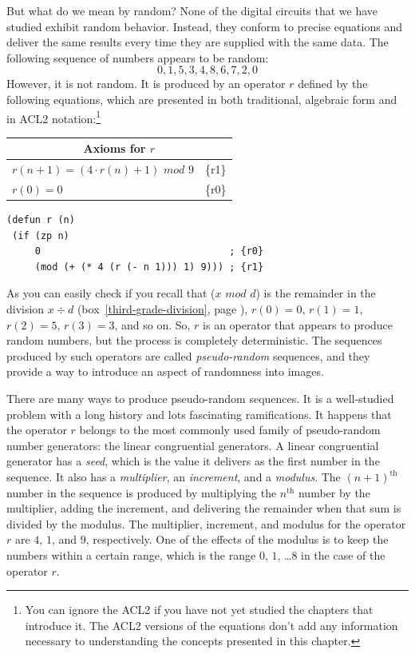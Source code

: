 But what do we mean by random?
None of the digital circuits
that we have studied exhibit random behavior.
Instead, they conform to precise equations and deliver the same
results every time they are supplied with the same data.
The following sequence of numbers appears to be random:
$$0, 1, 5, 3, 4, 8, 6, 7, 2, 0$$
However, it is not random. It is produced by an
operator $r$ defined by the following equations,
which are presented in both traditional, algebraic form
and in ACL2 notation:\footnote{You can ignore the ACL2
if you have not yet studied the chapters that introduce it.
The ACL2 versions of the equations don't add any information
necessary to understanding the concepts presented in this chapter.}
\begin{center}
\begin{tabular}{ll}
\multicolumn{2}{c}{Axioms for $r$}\\
\hline
$r(n+1) = (4\cdot r(n) + 1)$ $mod$ $9$ & \{r1\}\\
$r(0) = 0$                        & \{r0\}\\
\end{tabular}
\end{center}
\begin{code}	
\begin{verbatim}
(defun r (n)
 (if (zp n)
     0                                 ; {r0}
     (mod (+ (* 4 (r (- n 1))) 1) 9))) ; {r1}
\end{verbatim}
\end{code}

As you can easily check if you
recall that ($x$ $mod$ $d$) is the remainder in
the division $x \div d$
(box~\ref{third-grade-division}, page \pageref{third-grade-division}),
$r(0) = 0$, $r(1) = 1$, $r(2) = 5$, $r(3) = 3$,
and so on.
So, $r$ is an operator that appears to produce random
numbers, but the process is completely deterministic.
The sequences produced by such operators
are called \emph{pseudo-random}
sequences,
and they provide a way to introduce an aspect of randomness into images.

There are many ways to produce pseudo-random sequences.
It is a well-studied problem with a long history and lots
fascinating ramifications. It happens that the operator
$r$ belongs to the most commonly used
family of pseudo-random number generators: the
linear congruential generators.
A linear congruential generator has a \emph{seed}, which is
the value it delivers as the first number in the sequence.
It also has a \emph{multiplier}, an \emph{increment}, and a \emph{modulus}.
The $(n+1)^\text{th}$ number in the sequence
is produced by multiplying the $n^\text{th}$ number by
the multiplier, adding the increment, and delivering
the remainder when that sum is divided by the modulus.
The multiplier, increment, and modulus for the operator $r$
are $4$, $1$, and $9$, respectively.
One of the effects of the modulus is to keep the numbers
within a certain range, which is the range $0$, $1$, \dots $8$ in
the case of the operator $r$.

